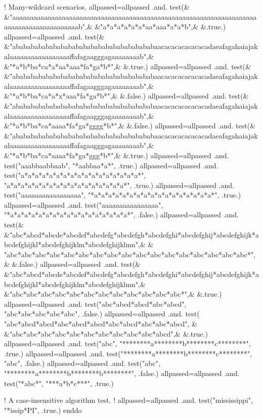\begin{DoxyVerb}
  ! Many-wildcard scenarios.
  allpassed=allpassed .and. test(&
  &"aaaaaaaaaaaaaaaaaaaaaaaaaaaaaaaaaaaaaaaaaaaaaaaaaaaaaaaaaaaaaaaaaaaaaaaaaaaaaaaaaaaaaaaaaab",&
  &"a*a*a*a*a*a*aa*aaa*a*a*b",&
  &.true.)
  allpassed=allpassed .and. test(&
  &"abababababababababababababababababababaacacacacacacacadaeafagahaiajakalaaaaaaaaaaaaaaaaaffafagaagggagaaaaaaaab",&
  &"*a*b*ba*ca*a*aa*aaa*fa*ga*b*",&
  &.true.)
  allpassed=allpassed .and. test(&
  &"abababababababababababababababababababaacacacacacacacadaeafagahaiajakalaaaaaaaaaaaaaaaaaffafagaagggagaaaaaaaab",&
  &"*a*b*ba*ca*a*x*aaa*fa*ga*b*",&
  &.false.)
  allpassed=allpassed .and. test(&
  &"abababababababababababababababababababaacacacacacacacadaeafagahaiajakalaaaaaaaaaaaaaaaaaffafagaagggagaaaaaaaab",&
  &"*a*b*ba*ca*aaaa*fa*ga*gggg*b*",&
  &.false.)
  allpassed=allpassed .and. test(&
  &"abababababababababababababababababababaacacacacacacacadaeafagahaiajakalaaaaaaaaaaaaaaaaaffafagaagggagaaaaaaaab",&
  &"*a*b*ba*ca*aaaa*fa*ga*ggg*b*",&
  &.true.)
  allpassed=allpassed .and. test("aaabbaabbaab", "*aabbaa*a*", .true.)
  allpassed=allpassed .and. test("a*a*a*a*a*a*a*a*a*a*a*a*a*a*a*a*a*", "a*a*a*a*a*a*a*a*a*a*a*a*a*a*a*a*a*", .true.)
  allpassed=allpassed .and. test("aaaaaaaaaaaaaaaaa", "*a*a*a*a*a*a*a*a*a*a*a*a*a*a*a*a*a*", .true.)
  allpassed=allpassed .and. test("aaaaaaaaaaaaaaaa", "*a*a*a*a*a*a*a*a*a*a*a*a*a*a*a*a*a*", .false.)
  allpassed=allpassed .and. test(&
  &"abc*abcd*abcde*abcdef*abcdefg*abcdefgh*abcdefghi*abcdefghij*abcdefghijk*abcdefghijkl*abcdefghijklm*abcdefghijklmn",&
  & "abc*abc*abc*abc*abc*abc*abc*abc*abc*abc*abc*abc*abc*abc*abc*abc*abc*",&
  &.false.)
  allpassed=allpassed .and. test(&
  &"abc*abcd*abcde*abcdef*abcdefg*abcdefgh*abcdefghi*abcdefghij*abcdefghijk*abcdefghijkl*abcdefghijklm*abcdefghijklmn",&
  &"abc*abc*abc*abc*abc*abc*abc*abc*abc*abc*abc*abc*",&
  &.true.)
  allpassed=allpassed .and. test("abc*abcd*abcd*abc*abcd", "abc*abc*abc*abc*abc", .false.)
  allpassed=allpassed .and. test( "abc*abcd*abcd*abc*abcd*abcd*abc*abcd*abc*abc*abcd", &
  &"abc*abc*abc*abc*abc*abc*abc*abc*abc*abc*abcd",&
  &.true.)
  allpassed=allpassed .and. test("abc", "********a********b********c********", .true.)
  allpassed=allpassed .and. test("********a********b********c********", "abc", .false.)
  allpassed=allpassed .and. test("abc", "********a********b********b********", .false.)
  allpassed=allpassed .and. test("*abc*", "***a*b*c***", .true.)

  ! A case-insensitive algorithm test.
  ! allpassed=allpassed .and. test("mississippi", "*issip*PI", .true.)
 enddo


\end{DoxyVerb}
